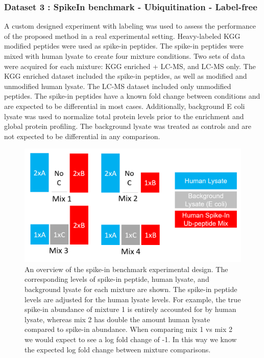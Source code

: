 \documentclass{mcp}
\begin{document}
\clearpage
\subsubsection{Dataset 3 : SpikeIn benchmark - Ubiquitination - Label-free}
\label{sec:benchmark}

A custom designed experiment with labeling was used to assess the performance of the proposed method in a real experimental setting. Heavy-labeled KGG modified peptides were used as spike-in peptides. The spike-in peptides were mixed with human lysate to create four mixture conditions. Two sets of data were acquired for each mixture: KGG enriched + LC-MS, and LC-MS only. The KGG enriched dataset included the spike-in peptides, as well as modified and unmodified human lysate. The LC-MS dataset included only unmodified peptides. The spike-in peptides have a known fold change between conditions and are expected to be differential in most cases. Additionally, background E coli lysate was used to normalize total protein levels prior to the enrichment and global protein profiling. The background lysate was treated as controls and are not expected to be differential in any comparison.

\begin{figure}[h!]
\centering
\includegraphics[width=.8\textwidth]{sim_new/SpikeIn_Overview}
\caption{An overview of the spike-in benchmark experimental design. The corresponding levels of spike-in peptide, human lysate, and background lysate for each mixture are shown. The spike-in peptide levels are adjusted for the human lysate levels. For example, the true spike-in abundance of mixture 1 is entirely accounted for by human lysate, whereas mix 2 has double the amount human lysate compared to spike-in abundance. When comparing mix 1 vs mix 2 we would expect to see a log fold change of -1. In this way we know the expected log fold change between mixture comparisons. \label{fig:spikein_overview}}
\end{figure}
\end{document}
